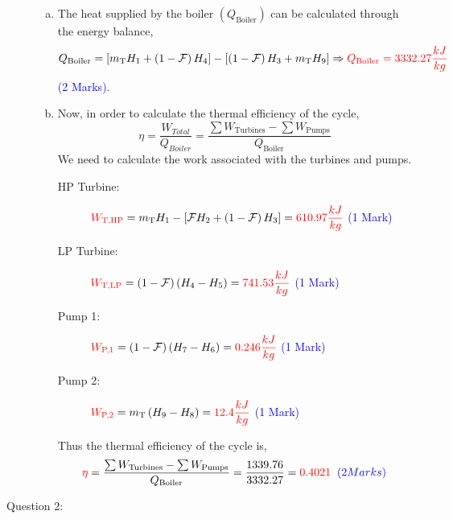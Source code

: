 \documentclass[12pt,twoside]{report}
\newcommand{\frc}{\displaystyle\frac}
\begin{document}
\begin{description}
\begin{enumerate}[(a)]
\item The heat supplied by the boiler $\left(Q_{\text{Boiler}}\right)$ can be calculated through the energy balance,
\begin{displaymath}
Q_{\text{Boiler}}=\left[m_{\text{T}} H_{1} + \left(1-\mathcal{F}\right)H_{4}\right] - \left[\left(1-\mathcal{F}\right)H_{3}+m_{\text{T}}H_{9}\right] \Rightarrow \textcolor{red}{Q_{\text{Boiler}}=3332.27 \frc{kJ}{kg}}
\end{displaymath}
\textcolor{blue}{(2 Marks)}.

\item Now, in order to calculate the thermal efficiency of the cycle,
\begin{displaymath}
\eta=\frc{W_{Total}}{Q_{Boiler}} = \frc{\sum W_{\text{Turbines}} - \sum W_{\text{Pumps}}}{Q_{\text{Boiler}}}
\end{displaymath} 
We need to calculate the work associated with the turbines and pumps.
\begin{description}
%
\item [HP Turbine:] $\textcolor{red}{W_{\text{T,HP}}}=m_{\text{T}}H_{1}-\left[\mathcal{F}H_{2}+\left(1-\mathcal{F}\right)H_{3}\right]=\textcolor{red}{610.97\frc{kJ}{kg}}$ \textcolor{blue}{(1 Mark)}
%
\item [LP Turbine:] $\textcolor{red}{W_{\text{T,LP}}}=\left(1-\mathcal{F}\right)\left(H_{4}-H_{5}\right) = \textcolor{red}{741.53\frc{kJ}{kg}}$ \textcolor{blue}{(1 Mark)}
%
\item [Pump 1:] $\textcolor{red}{W_{\text{P,1}}}= \left(1-\mathcal{F}\right)\left(H_{7}-H_{6}\right)=\textcolor{red}{0.246\frc{kJ}{kg}}$ \textcolor{blue}{(1 Mark)}
%
\item [Pump 2:] $\textcolor{red}{W_{\text{P,2}}}= m_{\text{T}} \left(H_{9}-H_{8}\right) =\textcolor{red}{12.4\frc{kJ}{kg}}$ \textcolor{blue}{(1 Mark)}
%
\end{description}

Thus the thermal efficiency of the cycle is,
\begin{displaymath}
\textcolor{red}{\eta} = \frc{\sum W_{\text{Turbines}} - \sum W_{\text{Pumps}}}{Q_{\text{Boiler}}} = \frc{1339.76}{3332.27} = \textcolor{red}{0.4021} \;\;\textcolor{blue}{(2 Marks)} 
\end{displaymath}


\end{enumerate}

\clearpage

\item [Question 2:] \mbox{}\\


\end{description}
\end{document}
